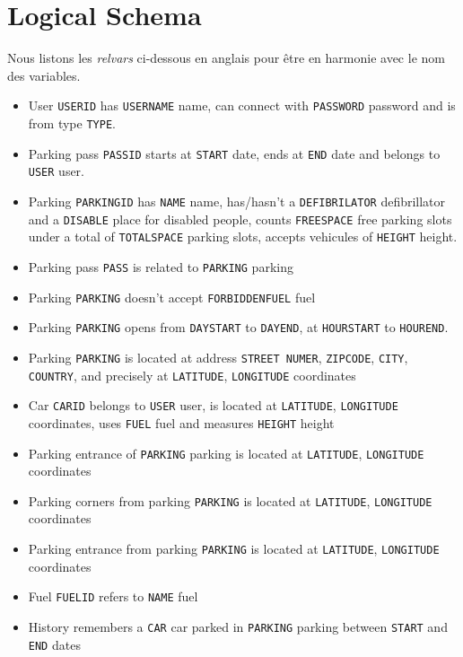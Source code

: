 \documentclass[a4paper,11pt]{article}
\begin{document}
\section{Logical Schema}
Nous listons les \textit{relvars} ci-dessous en anglais pour être en harmonie avec le nom des variables.
\begin{itemize}
  \item User \texttt{USERID} has \texttt{USERNAME} name, can connect with \texttt{PASSWORD} password and is from type \texttt{TYPE}.
  \item Parking pass \texttt{PASSID} starts at \texttt{START} date, ends at \texttt{END} date and belongs to \texttt{USER} user.
  \item Parking \texttt{PARKINGID} has \texttt{NAME} name, has/hasn't a \texttt{DEFIBRILATOR} defibrillator and a \texttt{DISABLE} place for disabled people, counts \texttt{FREESPACE} free parking slots under a total of \texttt{TOTALSPACE} parking slots, accepts vehicules of \texttt{HEIGHT} height.
  \item Parking pass \texttt{PASS} is related to \texttt{PARKING} parking
  \item Parking \texttt{PARKING} doesn't accept \texttt{FORBIDDENFUEL} fuel
  \item Parking \texttt{PARKING} opens from \texttt{DAYSTART} to \texttt{DAYEND}, at \texttt{HOURSTART} to \texttt{HOUREND}.
  \item Parking \texttt{PARKING} is located at address \texttt{STREET NUMER}, \texttt{ZIPCODE}, \texttt{CITY}, \texttt{COUNTRY}, and precisely at \texttt{LATITUDE}, \texttt{LONGITUDE} coordinates
  \item Car \texttt{CARID} belongs to \texttt{USER} user, is located at \texttt{LATITUDE}, \texttt{LONGITUDE} coordinates, uses \texttt{FUEL} fuel and measures \texttt{HEIGHT} height
  \item Parking entrance of \texttt{PARKING} parking is located at \texttt{LATITUDE}, \texttt{LONGITUDE} coordinates
  \item Parking corners from parking \texttt{PARKING} is located at \texttt{LATITUDE}, \texttt{LONGITUDE} coordinates
  \item Parking entrance from parking \texttt{PARKING} is located at \texttt{LATITUDE}, \texttt{LONGITUDE} coordinates
  \item Fuel \texttt{FUELID} refers to \texttt{NAME} fuel
  \item History remembers a \texttt{CAR} car parked in \texttt{PARKING} parking between \texttt{START} and \texttt{END} dates
\end{itemize}
\end{document}
